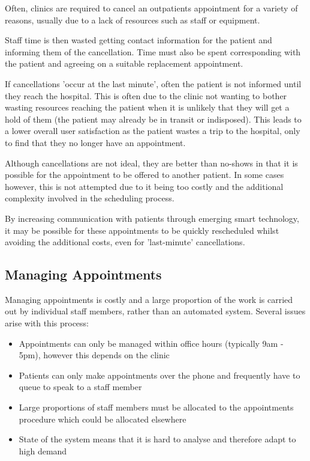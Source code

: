 Often, clinics are required to cancel an outpatients appointment for a variety of reasons, usually due to a lack of resources such as staff or equipment.

Staff time is then wasted getting contact information for the patient and informing them of the cancellation. Time must also be spent corresponding with the patient and agreeing on a suitable replacement appointment.

If cancellations 'occur at the last minute', often the patient is not informed until they reach the hospital. This is often due to the clinic not wanting to bother wasting resources reaching the patient when it is unlikely that they will get a hold of them (the patient may already be in transit or indisposed). This leads to a lower overall user satisfaction as the patient wastes a trip to the hospital, only to find that they no longer have an appointment.

Although cancellations are not ideal, they are better than no-shows in that it is possible for the appointment to be offered to another patient. In some cases however, this is not attempted due to it being too costly and the additional complexity involved in the scheduling process.

By increasing communication with patients through emerging smart technology, it may be possible for these appointments to be quickly rescheduled whilst avoiding the additional costs, even for 'last-minute' cancellations.

\subsection{Managing Appointments}

Managing appointments is costly and a large proportion of the work is carried out by individual staff members, rather than an automated system. Several issues arise with this process:

\begin{itemize}
	\item Appointments can only be managed within office hours (typically 9am - 5pm), however this depends on the clinic
	\item Patients can only make appointments over the phone and frequently have to queue to speak to a staff member
	\item Large proportions of staff members must be allocated to the appointments procedure which could be allocated elsewhere
	\item State of the system means that it is hard to analyse and therefore adapt to high demand
	
\end{itemize}

